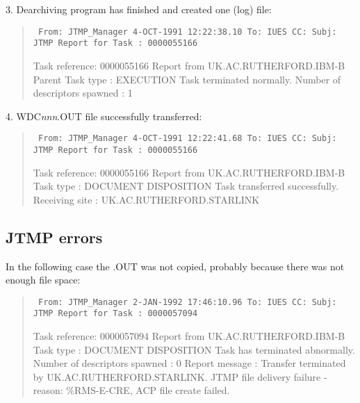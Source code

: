 \rm
3. Dearchiving program has finished and created one (log) file:

\begin{quote}
{\small
\tt
From:	JTMP\_Manager  4-OCT-1991 12:22:38.10
\newline
To:	IUES        
\newline
CC:	
\newline
Subj:	JTMP Report for Task : 0000055166

Task reference: 0000055166
\newline
Report from UK.AC.RUTHERFORD.IBM-B
\newline
Parent Task type : EXECUTION
\newline
Task terminated normally.
\newline
Number of descriptors spawned : 1
}
\end{quote}

\rm
4. WDC{\it nnn}.OUT file successfully transferred:

\begin{quote}
{\small
\tt
From:	JTMP\_Manager  4-OCT-1991 12:22:41.68                                   
\newline
To:	IUES        
\newline
CC:	
\newline
Subj:	JTMP Report for Task : 0000055166

Task reference: 0000055166
\newline
Report from UK.AC.RUTHERFORD.IBM-B
\newline
Task type : DOCUMENT DISPOSITION
\newline
Task transferred successfully.
\newline
Receiving site : UK.AC.RUTHERFORD.STARLINK
}
\end{quote}

\rm
\subsection {JTMP errors}
In the following case the .OUT was not copied, probably because there was not 
enough file space:

\begin{quote}
{\small
\tt
From:	JTMP\_Manager  2-JAN-1992 17:46:10.96
\newline
To:	IUES        
\newline
CC:	
\newline
Subj:	JTMP Report for Task : 0000057094

Task reference: 0000057094
\newline
Report from UK.AC.RUTHERFORD.IBM-B
\newline
Task type : DOCUMENT DISPOSITION
\newline
Task has terminated abnormally.
\newline
Number of descriptors spawned : 0
\newline
Report message : 
\newline
Transfer terminated by UK.AC.RUTHERFORD.STARLINK. JTMP file delivery failure 
\newline
- reason:  \%RMS-E-CRE, ACP file create failed.
}
\end{quote}

